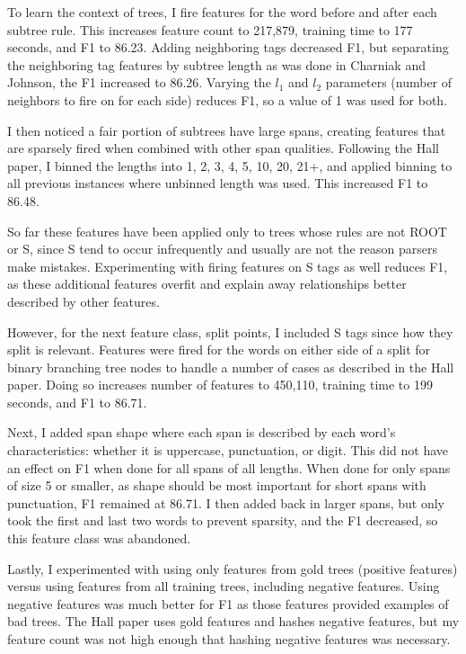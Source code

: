 \documentclass[11pt]{article}
\begin{document}
To learn the context of trees, I fire features for the word before and after each subtree rule.
This increases feature count to 217,879, training time to 177 seconds, and F1 to 86.23.
Adding neighboring tags decreased F1, but separating the neighboring tag features by subtree
length as was done in Charniak and Johnson, the F1 increased to 86.26. Varying the $l_1$ and $l_2$
parameters (number of neighbors to fire on for each side) reduces F1, so a value of 1 was used
for both.

I then noticed a fair portion of subtrees have large spans, creating features that are sparsely
fired when combined with other span qualities. Following the Hall paper, I binned the lengths
into 1, 2, 3, 4, 5, 10, 20, 21+, and applied binning to all previous instances where unbinned
length was used. This increased F1 to 86.48.

So far these features have been applied only to trees whose rules are not ROOT or S, since
S tend to occur infrequently and usually are not the reason parsers make mistakes. Experimenting
with firing features on S tags as well reduces F1, as these additional features overfit and
explain away relationships better described by other features.

However, for the next feature class, split points, I included S tags since how they split is
relevant. Features were fired for the words on either side of a split for binary branching
tree nodes to handle a number of cases as described in the Hall paper. Doing so increases
number of features to 450,110, training time to 199 seconds, and F1 to 86.71.

Next, I added span shape where each span is described by each word's characteristics: whether
it is uppercase, punctuation, or digit. This did not have an effect on F1 when done for all
spans of all lengths. When done for only spans of size 5 or smaller, as shape should be most
important for short spans with punctuation, F1 remained at 86.71. I then added back in larger
spans, but only took the first and last two words to prevent sparsity, and the F1 decreased, so
this feature class was abandoned.

Lastly, I experimented with using only features from gold trees (positive features) 
versus using features from all training trees, including negative features. Using negative 
features was much better for F1 as those features provided examples of bad trees.
The Hall paper uses gold features and hashes negative features, but my feature count was
not high enough that hashing negative features was necessary. 
\end{document}
